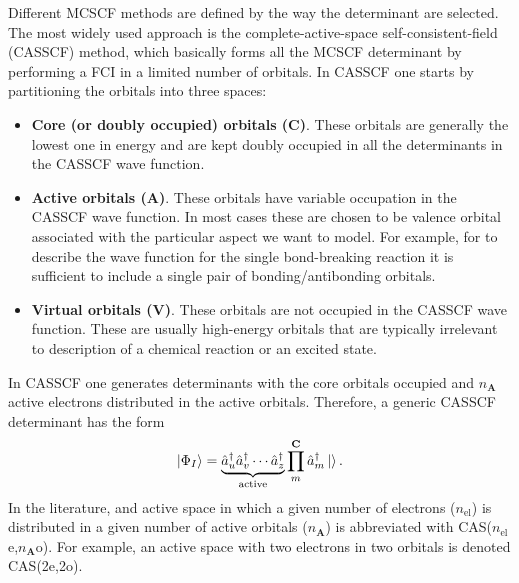 \documentclass[../Main/chem532-notes.tex]{subfiles}
\begin{document}
Different MCSCF methods are defined by the way the determinant are selected.
The most widely used approach is the complete-active-space self-consistent-field (CASSCF) method, which basically forms all the MCSCF determinant by performing a FCI in a limited number of orbitals.
In CASSCF one starts by partitioning the orbitals into three spaces:
\begin{itemize}
\item \textbf{Core (or doubly occupied) orbitals ($\mathbf{C}$)}. These orbitals are generally the lowest one in energy and are kept doubly occupied in all the determinants in the CASSCF wave function.
\item \textbf{Active orbitals ($\mathbf{A}$)}. These orbitals have variable occupation in the CASSCF wave function. In most cases these are chosen to be valence orbital associated with the particular aspect we want to model. For example, for to describe the wave function for the single bond-breaking reaction  it is sufficient to include a single pair of  bonding/antibonding orbitals.
\item \textbf{Virtual orbitals ($\mathbf{V}$)}. These orbitals are not occupied in the CASSCF wave function. These are usually high-energy orbitals that are typically irrelevant to description of a chemical reaction or an excited state. 
\end{itemize}

\begin{center}
\end{center}

In CASSCF one generates determinants with the core orbitals occupied and $n_\mathbf{A}$ active electrons distributed in the active orbitals.
Therefore, a generic CASSCF determinant has the form
\begin{equation}
\ket{\Phi_I} = \underbrace{\hat{a}_{u}^{\dagger} \hat{a}_{v}^{\dagger} \cdots  \hat{a}_{z}^{\dagger}}_{\text{active}} \prod_m^\mathbf{C} \hat{a}_{m}^{\dagger} \ket{}.
\end{equation}
In the literature, and active space in which a given number of electrons ($n_\mathrm{el}$) is distributed in a given number of active orbitals ($n_\mathbf{A}$) is abbreviated with CAS($n_\mathrm{el}$e,$n_\mathbf{A}$o).
For example, an active space with two electrons in two orbitals is denoted CAS(2e,2o).
\end{document}
